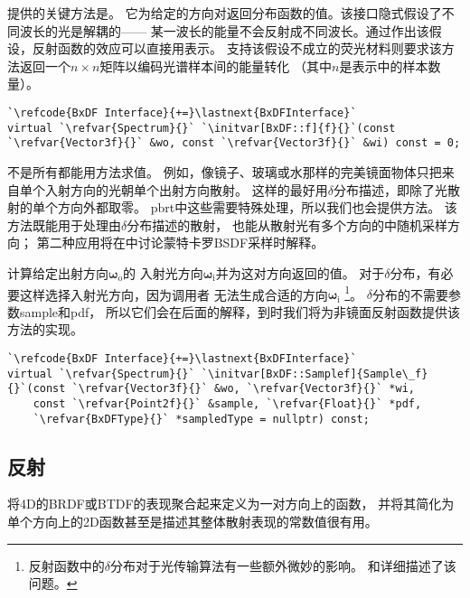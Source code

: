 提供的关键方法是。
它为给定的方向对返回分布函数的值。该接口隐式假设了不同波长的光是解耦的——
某一波长的能量不会反射成不同波长。通过作出该假设，反射函数的效应可以直接用表示。
支持该假设不成立的荧光材料则要求该方法返回一个$n\times n$矩阵以编码光谱样本间的能量转化
（其中$n$是表示中的样本数量）。
\begin{lstlisting}
`\refcode{BxDF Interface}{+=}\lastnext{BxDFInterface}`
virtual `\refvar{Spectrum}{}` `\initvar[BxDF::f]{f}{}`(const `\refvar{Vector3f}{}` &wo, const `\refvar{Vector3f}{}` &wi) const = 0;
\end{lstlisting}

不是所有都能用方法求值。
例如，像镜子、玻璃或水那样的完美镜面物体只把来自单个入射方向的光朝单个出射方向散射。
这样的最好用$\delta$分布描述，即除了光散射的单个方向外都取零。
pbrt中这些需要特殊处理，所以我们也会提供方法。
该方法既能用于处理由$\delta$分布描述的散射，
也能从散射光有多个方向的中随机采样方向；
第二种应用将在中讨论蒙特卡罗BSDF采样时解释。

计算给定出射方向${\bm\omega}_{\mathrm{o}}$的
入射光方向${\bm\omega}_{\mathrm{i}}$并为这对方向返回的值。
对于$\delta$分布，有必要这样选择入射光方向，因为调用者
无法生成合适的方向${\bm\omega}_{\mathrm{i}}$
\footnote{反射函数中的$\delta$分布对于光传输算法有一些额外微妙的影响。
    和详细描述了该问题。}。
$\delta$分布的不需要参数{\ttfamily sample}和{\ttfamily pdf}，
所以它们会在后面的解释，到时我们将为非镜面反射函数提供该方法的实现。
\begin{lstlisting}
`\refcode{BxDF Interface}{+=}\lastnext{BxDFInterface}`
virtual `\refvar{Spectrum}{}` `\initvar[BxDF::Samplef]{Sample\_f}{}`(const `\refvar{Vector3f}{}` &wo, `\refvar{Vector3f}{}` *wi,
    const `\refvar{Point2f}{}` &sample, `\refvar{Float}{}` *pdf,
    `\refvar{BxDFType}{}` *sampledType = nullptr) const;
\end{lstlisting}

\subsection{反射}\label{sub:反射}
将4D的BRDF或BTDF的表现聚合起来定义为一对方向上的函数，
并将其简化为单个方向上的2D函数甚至是描述其整体散射表现的常数值很有用。

